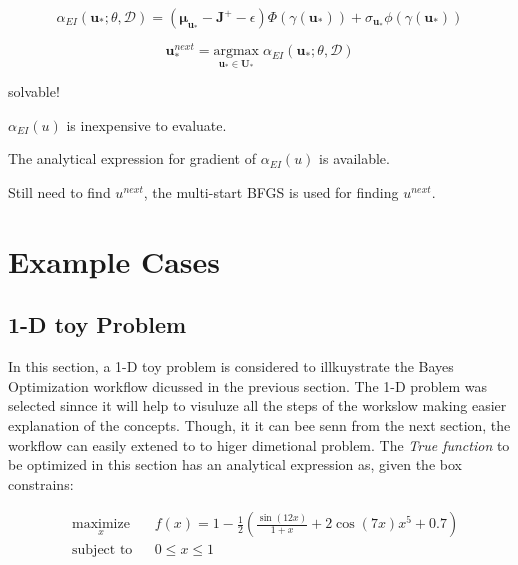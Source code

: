 \documentclass[]{elsarticle} %
\begin{document}
\begin{equation}
\alpha_{EI}(\mathbf{u_*};\theta,\mathcal{D})=(\mathbf{\mu_{u_\ast}}-\mathbf{J^+}-\epsilon)\Phi(\gamma(\mathbf{u
_*})) + \sigma_{\mathbf{u_{\ast}}} \phi(\gamma(\mathbf{u_*}))
\label{eq:eq:utility_no_greed}
\end{equation}

\begin{equation}
\mathbf{u}_*^{next}=\underset{\mathbf{u_*} \in \mathbf{U_*} }{\mathrm{argmax}} \; \alpha_{EI}(\mathbf{u_*};\theta,\mathcal{D})
\label{eq:exp-easy}
\end{equation}

solvable!

\(\alpha_{EI}(u)\) is inexpensive to evaluate.

The analytical expression for gradient of \(\alpha_{EI}(u)\) is
available.

Still need to find \(u^{next}\), the multi-start BFGS is used for
finding \(u^{next}\).

\newpage

\hypertarget{example-cases}{%
\section{Example Cases}\label{example-cases}}

\hypertarget{d-toy-problem}{%
\subsection{1-D toy Problem}\label{d-toy-problem}}

In this section, a 1-D toy problem is considered to illkuystrate the Bayes Optimization workflow dicussed in the previous section. The 1-D problem was selected sinnce it will help to visuluze all the steps of the workslow making easier explanation of the concepts. Though, it it can bee senn from the next section, the workflow can easily extened to to higer dimetional problem. The \emph{True function} to be optimized in this section has an analytical expression as, given the box constrains:

\begin{equation}
\begin{aligned}
& \underset{x}{\text{maximize}}
& & f(x) = 1-\frac{1}{2}(\frac{\sin (12x)}{1+x} + 2\cos(7x)x^5 + 0.7)  \\
& \text{subject to}
& & 0 \leq x \leq 1
\end{aligned}
\label{eq:1deq}
\end{equation}
\end{document}
